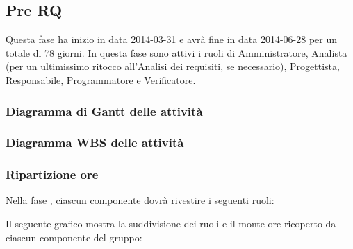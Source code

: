 \subsection{Pre RQ}
Questa fase ha inizio in data 2014-03-31 e avrà fine in data 2014-06-28 per un totale di 78 giorni. In questa fase sono attivi i ruoli di Amministratore, Analista (per un ultimissimo ritocco all'Analisi dei requisiti, se necessario), Progettista, Responsabile, Programmatore e Verificatore.

\subsubsection{Diagramma di Gantt delle attività}

\newpage
\subsubsection{Diagramma WBS delle attività}

\newpage
\subsubsection{Ripartizione ore}

\newpage
Nella fase , ciascun componente dovrà rivestire i seguenti ruoli:

Il seguente grafico mostra la suddivisione dei ruoli e il monte ore ricoperto da ciascun componente del gruppo:
